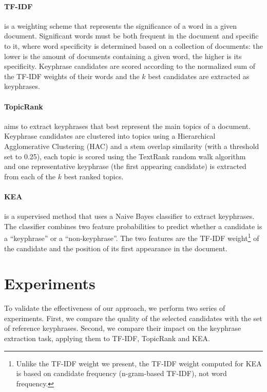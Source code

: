   \paragraph{TF-IDF~\textnormal{\cite{jones1972tfidf}}} is a weighting scheme
  that represents the significance of a word in a given document. Significant
  words must be both frequent in the document and specific to it, where word
  specificity is determined based on a collection of documents: the lower is the
  amount of documents containing a given word, the higher is its specificity.
  Keyphrase candidates are scored according to the normalized sum of the TF-IDF
  weights of their words and the $k$ best candidates are extracted as
  keyphrases.

  \paragraph{TopicRank~\textnormal{\cite{bougouin2013topicrank}}} aims to
  extract keyphrases that best represent the main topics of a document.
  Keyphrase candidates are clustered into topics using a Hierarchical
  Agglomerative Clustering (HAC) and a stem overlap similarity (with a threshold
  set to 0.25), each topic is scored using the TextRank random walk
  algorithm~\cite{mihalcea2004textrank} and one representative keyphrase (the
  first appearing candidate) is extracted from each of the $k$ best ranked
  topics.

  \paragraph{KEA~\textnormal{\cite{witten1999kea}}} is a supervised method that
  uses a Naive Bayes classifier to extract keyphrases. The classifier combines
  two feature probabilities to predict whether a candidate is a ``keyphrase'' or
  a ``non-keyphrase''. The two features are the TF-IDF weight\footnote{Unlike
  the TF-IDF weight we present, the TF-IDF weight computed for KEA is based on
  candidate frequency (n-gram-based TF-IDF), not word frequency.} of the
  candidate and the position of its first appearance in the document.

\section{Experiments}
\label{sec:evaluation}
  To validate the effectiveness of our approach, we perform two series of
  experiments. First, we compare the quality of the selected candidates with the
  set of reference keyphrases. Second, we compare their impact on the keyphrase
  extraction task, applying them to TF-IDF, TopicRank and KEA.

